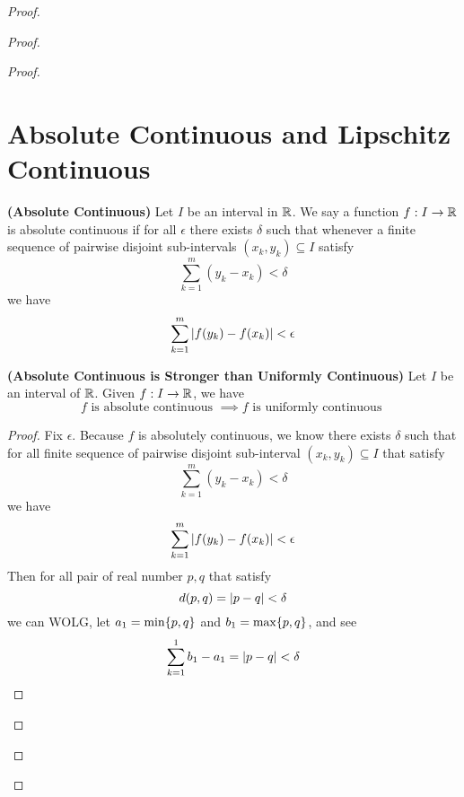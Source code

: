 \documentclass{report}
\begin{document}
\begin{proof}
\begin{proof}
\begin{proof}
\section{Absolute Continuous and Lipschitz Continuous}
\begin{definition}
\label{5.5.1}
\textbf{(Absolute Continuous)} Let $I$ be an interval in $\mathbb{R}$. We say a function $f: I\rightarrow \mathbb{R}$ is absolute continuous if for all $\epsilon $ there exists $\delta$ such that whenever a finite sequence of pairwise disjoint sub-intervals $(x_k,y_k)\subseteq I$ satisfy
\begin{equation*}
\sum_{k=1}^m (y_k-x_k)< \delta
\end{equation*}
we have 
\begin{equation*}
\sum_{k=1}^m |f(y_k)-f(x_k)|<\epsilon 
\end{equation*}
\end{definition}
\begin{theorem}
\label{5.5.2}
\textbf{(Absolute Continuous is Stronger than Uniformly Continuous)} Let $I$ be an interval of $\mathbb{R}$. Given  $f:I\rightarrow \mathbb{R}$, we have 
\begin{equation*}
f\text{ is absolute continuous }\implies f\text{ is uniformly continuous }
\end{equation*}
\end{theorem}
\begin{proof}
Fix $\epsilon $. Because $f$ is absolutely continuous, we know there exists  $\delta$ such that for all finite sequence of pairwise disjoint sub-interval $(x_k,y_k)\subseteq I$ that satisfy
\begin{equation*}
\sum_{k=1}^m (y_k-x_k)<\delta
\end{equation*}
we have 
\begin{equation*}
\sum_{k=1}^m |f(y_k)-f(x_k)|<\epsilon 
\end{equation*}
Then for all pair of real number $p,q$ that satisfy 
\begin{equation*}
d(p,q)=|p-q|<\delta
\end{equation*}
we can WOLG, let $a_1=\min  \{ p,q \}$  and $b_1=\max  \{ p,q \}$, and see
\begin{equation*}
  \sum_{k=1}^1 b_1-a_1=|p-q|<\delta
\end{equation*}

\end{proof}
\end{proof}
\end{proof}
\end{proof}
\end{document}
